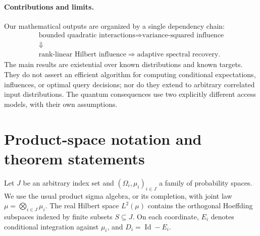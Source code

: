 \documentclass[11pt,letterpaper]{article}
\theoremstyle{definition}
\begin{document}
\paragraph{Contributions and limits.}
Our mathematical outputs are organized by a single dependency chain:
\[\begin{gathered}
\text{bounded quadratic interactions}\Longrightarrow\text{variance-squared influence}\\
\Downarrow\\
\text{rank-linear Hilbert influence}\Longrightarrow\text{adaptive spectral recovery}.
\end{gathered}\]
The main results are existential over known distributions and known targets.
They do not assert an efficient algorithm for computing conditional
expectations, influences, or optimal query decisions; nor do they extend to
arbitrary correlated input distributions. The quantum consequences use two
explicitly different access models, with their own assumptions.

\section{Product-space notation and theorem statements}\label{sec:setup}
Let $J$ be an arbitrary index set and $(\Omega_i,\mu_i)_{i\in J}$ a family
of probability spaces. We use the usual product sigma algebra, or its
completion, with joint law $\mu=\bigotimes_{i\in J}\mu_i$. The real Hilbert
space $L^2(\mu)$ contains the orthogonal Hoeffding subspaces indexed by
finite subsets $S\subseteq J$. On each coordinate, $E_i$ denotes conditional
integration against $\mu_i$, and $D_i=\operatorname{Id}-E_i$.
\end{document}
